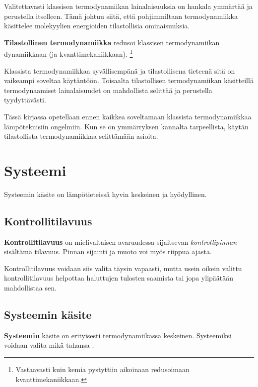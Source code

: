 \documentclass[12pt,a4paper,finnish]{book}
\begin{document}
Valitettavasti klassisen termodynamiikan lainalaisuuksia on hankala ymmärtää ja perustella itselleen. Tämä johtuu 
siitä, että pohjimmiltaan termodynamiikka käsittelee molekyylien energioiden tilastollisia ominaisuuksia.

\textbf{Tilastollinen termodynamiikka} redusoi klassisen termodynamiikan dynamiikkaan (ja kvanttimekaniikkaan).
\footnote{Vastaavasti kuin kemia pystyttiin aikoinaan redusoimaan kvanttimekaniikkaan.} 

Klassista termodynamiikkaa syvällisempänä ja tilastollisena tieteenä sitä on vaikeampi soveltaa käytäntöön. 
Toisaalta tilastollisen termodynamiikan käsitteillä termodynaamiset lainalaisuudet on mahdollista selittää ja 
perustella tyydyttävästi.

Tässä kirjassa opetellaan ennen kaikkea soveltamaan klassista termodynamiikkaa lämpöteknisiin ongelmiin. 
Kun se on ymmärryksen kannalta tarpeellista, käytän tilastollista termodynamiikkaa selittämään asioita.

\chapter{Systeemi} %

Systeemin käsite on lämpötieteissä hyvin keskeinen ja hyödyllinen.

\section{Kontrollitilavuus} \label{section:kontrollitilavuus} %

\textbf{Kontrollitilavuus} on mielivaltaisen avaruudessa sijaitsevan \textit{kontrollipinnan} sisältämä tilavuus. 
Pinnan sijainti ja muoto voi myös riippua ajasta. 

Kontrollitilavuus voidaan siis valita täysin vapaasti, 
mutta usein oikein valittu kontrollitilavuus helpottaa haluttujen tulosten saamista tai jopa ylipäätään mahdollistaa sen.

\section{Systeemin käsite} %

\textbf{Systeemin} käsite on erityisesti termodynamiikassa keskeinen. Systeemiksi voidaan valita mikä tahansa 
.
\end{document}
